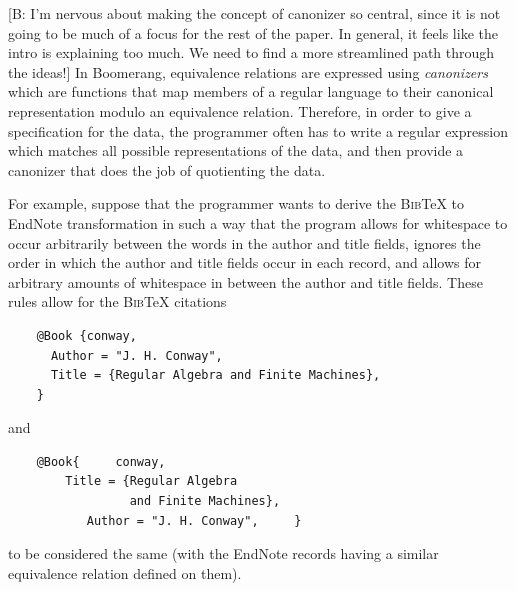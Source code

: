 \documentclass{svproc}
\newcommand{\FINISH}[3]{\ifdraft\textcolor{#1}{[#2: #3]}\fi}
\newcommand{\bcp}[1]{\FINISH{dkred}{B}{#1}}
\newcommand{\bibtex}{\textsc{Bib}\TeX{}}
\begin{document}
\bcp{I'm nervous about making the concept of canonizer so central, since it
  is not going to be much of a focus for the rest of the paper.  In general,
it feels like the intro is explaining too much.  We need to find a more
streamlined path through the ideas!}
In Boomerang, equivalence relations are expressed using {\em canonizers}
which are functions that map members of a regular language to their canonical
representation modulo an equivalence relation. Therefore, in order to give a
specification for the data, the programmer often has to write a
regular expression which matches all possible representations of the data, and
then provide a canonizer that does the job of quotienting the data.

For example, suppose that the programmer wants to
derive the \bibtex{} to EndNote transformation in such a way that the program
allows for whitespace to occur arbitrarily between the words in the author and
title fields, ignores the order in which the author and title fields occur in
each record, and allows for arbitrary amounts of whitespace in between the
author and title fields. These rules allow for the \bibtex{} citations
\begin{verbatim}
    @Book {conway,
      Author = "J. H. Conway",
      Title = {Regular Algebra and Finite Machines},
    }
\end{verbatim}
and
\begin{verbatim}
    @Book{     conway,
        Title = {Regular Algebra 
                 and Finite Machines},
           Author = "J. H. Conway",     }
\end{verbatim}
to be considered the same (with the EndNote records having a similar
equivalence relation defined on them).
\end{document}
